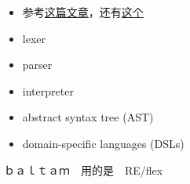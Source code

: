 
\begin{issues}
\issueDraft
\end{issues}

\begin{itemize}
\item 参考\href{https://www.toptal.com/scala/writing-an-interpreter}{这篇文章}，还有\href{https://www.youtube.com/watch?v=Xu4RtLlm42I}{这个}

\item lexer
\item parser
\item interpreter
\item abstract syntax tree (AST)
\item domain-specific languages (DSLs)
\end{itemize}


ｂａｌｔａｍ　用的是　RE/flex